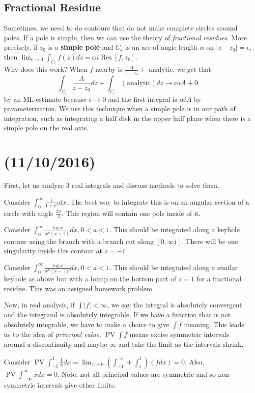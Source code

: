\documentclass[11pt,leqno,oneside]{amsart}
\numberwithin{thm}{section}
\newcommand{\Res}{\operatorname{Res}}
\newcommand{\PV}{\operatorname{PV}}
\begin{document}
  \subsection*{Fractional Residue}
  Sometimes, we need to do contours that do not make complete circles
  around poles. If a pole is simple, then we can use the theory of
  \emph{fractional residues}. More precisely, if $z_0$ is a
  \textbf{simple pole} and $C_\epsilon$ is an arc of angle length
  $\alpha$ on $|z-z_0| = \epsilon$, then $\lim_{\epsilon \to 0}
  \int_{C_\epsilon} f(z)dz = \alpha i \Res[f,z_0]$. \\

  Why does this work? When $f$ nearby is $\frac{A}{z-z_0} + $
  analytic, we get that \[
    \int_{C_\epsilon} \frac{A}{z-z_0}dz + \int_{C_\epsilon}
    (\text{analytic})dz \to \alpha i A + 0
  \]
  by an ML-estimate because $\epsilon \to 0$ and the first integral
  is $\alpha i A$ by parameterization. We use this technique when a
  simple pole is in our path of integration, such as integrating a
  half disk in the upper half plane when there is a simple pole on the
  real axis.
\section{(11/10/2016)}
  First, let us analyze 3 real integrals and discuss methods to solve
  them.
  \begin{example}
    Consider $\int_0^\infty \frac{1}{1+x^3}dx$. The best way to
    integrate this is on an angular section of a circle with angle
    $\frac{2\pi}{3}$. This region will contain one pole inside of it.
  \end{example}
  \begin{example}
    Consider $\int_0^\infty \frac{\log x}{x^a(x+1)}dx, 0 < a < 1$. This should be
    integrated along a keyhole contour using the branch with a branch
    cut along $[0,\infty)]$.  There will be one singularity inside
    this contour at $z=-1$
  \end{example}
  \begin{example}
    Consider $\int_0^\infty \frac{\log x}{x^a(x-1)}dx, 0 < a <
    1$. This should be integrated along a similar keyhole as above but
    with a bump on the bottom part of $z=1$ for a fractional
    residue. This was an assigned homework problem.
  \end{example}
  Now, in real analysis, if $\int |f| < \infty$, we say the integral
  is absolutely convergent and the integrand is absolutely
  integrable. If we have a function that is not absolutely integrable,
  we have to make a choice to give $\int f$ meaning. This leads us to
  the idea of \emph{principal value}. $\PV \int f$ means excise
  symmetric intervals around a discontinuity and maybe $\infty$ and
  take the limit as the intervals shrink.
  \begin{example}
    Consider $\PV \int_{-1}^1 \frac{1}{x}dx = \lim_{\epsilon \to 0}
    \left( \int_{-1}^{-\epsilon} + \int_{\epsilon}^1 \right)(f dx) =
    0$. Also, $\PV \int_{-\infty}^\infty xdx = 0$. Note, not all
    principal values are symmetric and so non-symmetric intervals give
    other limits.
  \end{example}
\end{document}
